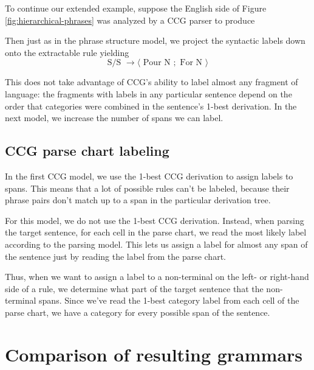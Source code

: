 \documentclass[a4paper]{article}
\begin{document}
To continue our extended example, suppose the English side of Figure \ref{fig:hierarchical-phrases} was analyzed by a CCG parser to produce
\begin{center}
\end{center}
Then just as in the phrase structure model, we project the syntactic labels down onto the extractable rule yielding
\begin{equation}
\textrm{S/S } \to \langle \textrm{ Pour N }; \textrm{ For N } \rangle
\end{equation}

This does not take advantage of CCG's ability to label almost any fragment of language: the fragments with labels in any particular sentence depend on the order that categories were combined in the sentence's 1-best derivation. In the next model, we increase the number of spans we can label.

\subsection{CCG parse chart labeling}

In the first CCG model, we use the 1-best CCG derivation to assign labels to spans. This means that a lot of possible rules can't be labeled, because their phrase pairs don't match up to a span in the particular derivation tree.

For this model, we do not use the 1-best CCG derivation. Instead, when parsing the target sentence, for each cell in the parse chart, we read the most likely label according to the parsing model. This lets us assign a label for almost any span of the sentence just by reading the label from the parse chart.

Thus, when we want to assign a label to a non-terminal on the left- or right-hand side of a rule, we determine what part of the target sentence that the non-terminal spans. Since we've read the 1-best category label from each cell of the parse chart, we have a category for every possible span of the sentence.

\section{Comparison of resulting grammars}
\label{sec:comparison}
\end{document}
